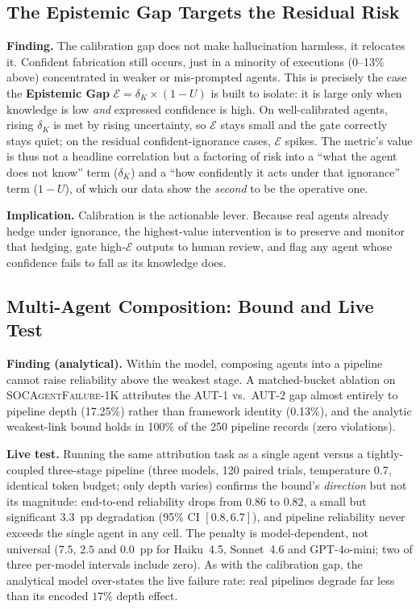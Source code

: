 \documentclass[journal,compsoc]{IEEEtran}
\newcommand{\SAFK}{\textsc{SOCAgentFailure-1K}}
\begin{document}
\subsection{The Epistemic Gap Targets the Residual Risk}

\textbf{Finding.} The calibration gap does not make hallucination
harmless, it relocates it. Confident fabrication still occurs, just in
a minority of executions (0--13\% above) concentrated in weaker or
mis-prompted agents. This is precisely the case the \textbf{Epistemic
Gap} $\mathcal{E} = \delta_K \times (1 - U)$ is built to isolate: it is
large only when knowledge is low \textit{and} expressed confidence is
high. On well-calibrated agents, rising $\delta_K$ is met by rising
uncertainty, so $\mathcal{E}$ stays small and the gate correctly stays
quiet; on the residual confident-ignorance cases, $\mathcal{E}$ spikes.
The metric's value is thus not a headline correlation but a factoring
of risk into a ``what the agent does not know'' term ($\delta_K$) and a
``how confidently it acts under that ignorance'' term ($1 - U$), of
which our data show the \textit{second} to be the operative one.

\textbf{Implication.} Calibration is the actionable lever. Because
real agents already hedge under ignorance, the highest-value
intervention is to preserve and monitor that hedging, gate high-$\mathcal{E}$
outputs to human review, and flag any agent whose confidence fails to
fall as its knowledge does.

\subsection{Multi-Agent Composition: Bound and Live Test}

\textbf{Finding (analytical).} Within the model, composing agents into
a pipeline cannot raise reliability above the weakest stage. A
matched-bucket ablation on \SAFK{} attributes the AUT-1 vs.\ AUT-2 gap
almost entirely to pipeline depth (17.25\%) rather than framework
identity (0.13\%), and the analytic weakest-link bound holds in 100\%
of the 250 pipeline records (zero violations).

\textbf{Live test.} Running the same attribution task as a single agent
versus a tightly-coupled three-stage pipeline (three models, 120 paired
trials, temperature 0.7, identical token budget; only depth varies)
confirms the bound's \emph{direction} but not its magnitude: end-to-end
reliability drops from $0.86$ to $0.82$, a small but significant
$3.3$~pp degradation (95\% CI $[0.8, 6.7]$), and pipeline reliability
never exceeds the single agent in any cell. The penalty is
model-dependent, not universal ($7.5$, $2.5$ and $0.0$~pp for
Haiku~4.5, Sonnet~4.6 and GPT-4o-mini; two of three per-model intervals
include zero). As with the calibration gap, the
analytical model over-states the live failure rate: real pipelines
degrade far less than its encoded $17\%$ depth effect.
\end{document}
